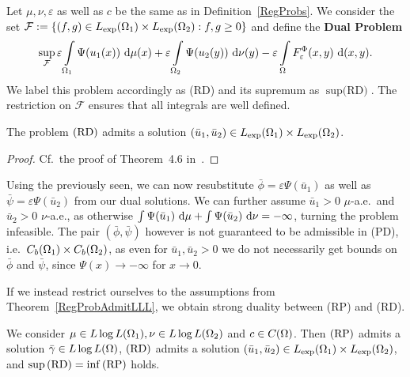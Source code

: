\begin{definition}\label{RegDualProb}
	Let $\mu, \nu, \varepsilon$ as well as $c$ be the same as in Definition~\ref{RegProbs}. We consider the set $\mathcal{F} := \{ (f, g) \in \Lexp[\Omega_1] \times \Lexp[\Omega_2] : f, g \ge 0 \}$ and define the \textbf{Dual Problem}
	\[ \sup\limits_{\mathcal{F}} \varepsilon \int\limits_{\Omega_1} \Psi(u_1(x))~\Dx{\mu} + \varepsilon \int\limits_{\Omega_2} \Psi(u_2(y))~\Dx[y]{\nu} - \varepsilon \int\limits_{\Omega} F_{\varepsilon}^{\Phi}(x, y)~\Dx[x, y]{}. \]
	We label this problem accordingly as (RD) and its supremum as $\sup \text{(RD)}$. The restriction on $\mathcal{F}$ ensures that all integrals are well defined.
\end{definition}

\begin{theorem}\label{RegDualAdmit}
	The problem$\text{\normalfont\ (RD)}$ admits a solution $(\bar{u}_1, \bar{u}_2) \in \Lexp[\Omega_1] \times \Lexp[\Omega_2]$.
\end{theorem}

\begin{proof}
	Cf.~the proof of Theorem~4.6 in~\cite{Cla2021}.
\end{proof}

Using the previously seen, we can now resubstitute $\bar{\phi} = \varepsilon \Psi(\bar{u}_1)$ as well as $\bar{\psi} = \varepsilon \Psi(\bar{u}_2)$ from our dual solutions. We can further assume $\bar{u}_1 > 0$ $\mu$-a.e.\ and $\bar{u}_2 > 0$ $\nu$-a.e., as otherwise $\int \Psi(\bar{u}_1)~\D + \int \Psi(\bar{u}_2)~\D[\nu] = -\infty$, turning the problem infeasible. The pair $(\bar{\phi}, \bar{\psi})$ however is not guaranteed to be admissible in (PD), i.e.~$\CF[b]{\Omega_1} \times \CF[b]{\Omega_2}$, as even for $\bar{u}_1, \bar{u}_2 > 0$ we do not necessarily get bounds on $\bar{\phi}$ and $\bar{\psi}$, since $\Psi(x) \rightarrow -\infty$ for $x \rightarrow 0$.

If we instead restrict ourselves to the assumptions from Theorem~\ref{RegProbAdmitLLL}, we obtain strong duality between (RP) and (RD).

\begin{theorem}\label{RegStrongDualityLLL}
	We consider $\mu \in \LLL[\Omega_1], \nu \in \LLL[\Omega_2]$ and $c \in \CF{\Omega}$. Then$\text{\normalfont\ (RP)}$ admits a solution $\bar{\gamma} \in \LLL$,$\text{\normalfont\ (RD)}$ admits a solution $(\bar{u}_1, \bar{u}_2) \in \Lexp[\Omega_1] \times \Lexp[\Omega_2]$, and $\sup\!\text{\normalfont\,(RD)} = \inf\!\text{\normalfont\,(RP)}$ holds.
\end{theorem}

